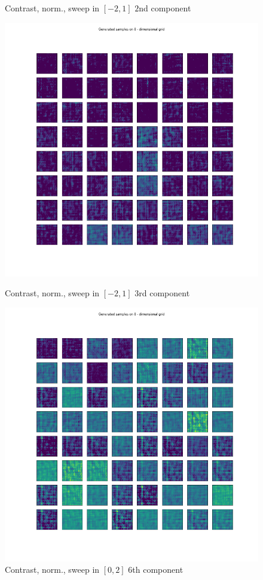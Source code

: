 \documentclass[12pt, english]{article}
\begin{document}
\begin{figure}[H]
\begin{minipage}{0.5\linewidth}
    \caption{Contrast, norm., sweep in $[-2, 1]$ \newline $2$nd component} 
    \label{fig:contrast-norm-sweep-2}
  \end{minipage}
\end{figure}


\begin{figure}[H]
  \begin{minipage}{0.5\linewidth}
    \centering
    \includegraphics[width=.85\linewidth]{sweep/norm_contrast_sweep_minus_two_to_one_3rd_param.png} 
    \caption{Contrast, norm., sweep in $[-2, 1]$ \newline  $3$rd component} 
    \label{fig:contrast-norm-sweep-3}
  \end{minipage}
  \begin{minipage}{0.5\linewidth}
    \centering
    \includegraphics[width=.85\linewidth]{sweep/norm_contrast_sweep_zero_to_two_6th_param.png} 
    \caption{Contrast, norm., sweep in $[0, 2]$ \newline $6$th component} 
    \label{fig:contrast-norm-sweep-6}
  \end{minipage}
\end{figure}
\end{document}
